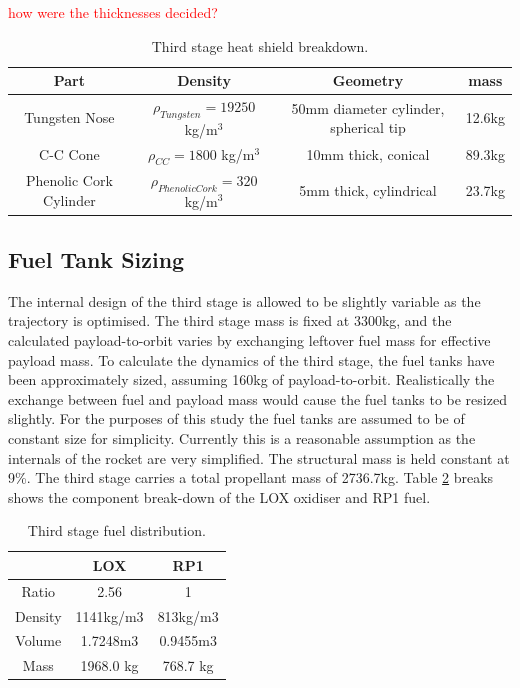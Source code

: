 \textcolor{red}{how were the thicknesses decided?}

		\begin{table}[h]
			\centering
\begin{tabular}{|c|c|c|c|}
	\hline  Part & Density & Geometry & mass \\ 
	\hline  Tungsten Nose & $\rho_{Tungsten} = 19250$  kg/m$^3$ & 50mm diameter cylinder, spherical tip & 12.6kg \\ 
		\hline C-C Cone & $\rho_{CC} = 1800$  kg/m$^3$ & 10mm thick, conical & 89.3kg \\ 
			\hline Phenolic Cork Cylinder & $\rho_{Phenolic Cork} = 320$  kg/m$^3$ & 5mm thick, cylindrical & 23.7kg \\ 
	\hline 
\end{tabular} 
\caption{Third stage heat shield breakdown.}
\label{tab:heatshield}
\end{table}
		
		\subsection{Fuel Tank Sizing}
		The internal design of the third stage is allowed to be slightly variable as the trajectory is optimised. The third stage mass is fixed at 3300kg, and the calculated payload-to-orbit varies by exchanging leftover fuel mass for effective payload mass. To calculate the dynamics of the third stage, the fuel tanks have been approximately sized, assuming 160kg of payload-to-orbit. Realistically the exchange between fuel and payload mass would cause the fuel tanks to be resized slightly. For the purposes of this study the fuel tanks are assumed to be of constant size for simplicity. Currently this is a reasonable assumption as the internals of the rocket are very simplified. The structural mass is held constant at 9\%. The third stage carries a total propellant mass of 2736.7kg. Table \ref{tab:Fuel} breaks shows the component break-down of the LOX oxidiser and RP1 fuel.  
		
		\begin{table}[h]
			\centering
\begin{tabular}{|c|c|c|}
	\hline  & \textbf{LOX} & \textbf{RP1} \\ 
	\hline Ratio & 2.56 & 1 \\ 
	\hline Density & 1141kg/m3 & 813kg/m3 \cite{Magee}\\ 
	\hline Volume & 1.7248m3 & 0.9455m3 \\ 
	\hline Mass & 1968.0 kg & 768.7 kg \\ 
	\hline 
\end{tabular} 
\caption{Third stage fuel distribution.}
\label{tab:Fuel}
		\end{table}

